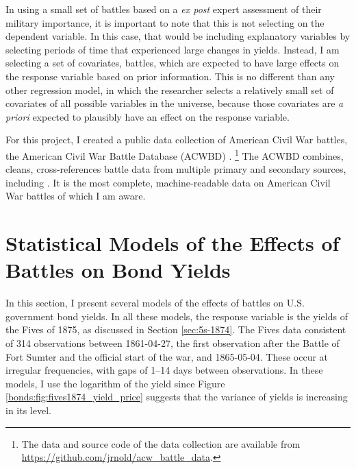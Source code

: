 In using a small set of battles based on a \textit{ex post} expert assessment of their military importance, it is important to note that this is not selecting on the dependent variable.
In this case, that would be including explanatory variables by selecting periods of time that experienced large changes in yields.
Instead, I am selecting a set of covariates, \ie{}battles, which are expected to have large effects on the response variable based on prior information.
This is no different than any other regression model, in which the researcher selects a relatively small set of covariates of all possible variables in the universe, because those covariates are \textit{a priori} expected to plausibly have an effect on the response variable.

For this project, I created a public data collection of American Civil War battles, the American Civil War Battle Database (ACWBD) \parencite{Arnold2015b}.%
\footnote{The data and source code of the data collection are available from \url{https://github.com/jrnold/acw_battle_data}.}
The ACWBD combines, cleans, cross-references battle data from multiple primary and secondary sources, including \textcites{Phisterer1883}{Livermore1900}{Bodart1908}{dyer1908_war_rebel}{KennedyConservation1998}{CWSAC1993}{cwsac2012}.
It is the most complete, machine-readable data on American Civil War battles of which I am aware.

\clearpage

\section{Statistical Models of the Effects of Battles on Bond Yields}
\label{sec:model-war-events}

In this section, I present several models of the effects of battles on U.S. government bond yields.
In all these models, the response variable is the yields of the Fives of 1875, as discussed in Section \ref{sec:5s-1874}.
The Fives data consistent of 314 observations between 1861-04-27, the first observation after the Battle of Fort Sumter and the official start of the war, and 1865-05-04.
These occur at irregular frequencies, with gaps of 1--14 days between observations.
In these models, I use the logarithm of the yield since Figure \ref{bonds:fig:fives1874_yield_price} suggests that the variance of yields is increasing in its level.

